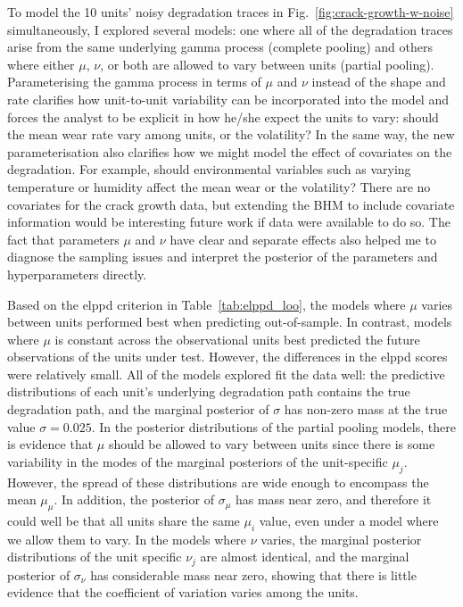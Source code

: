 To model the 10 units' noisy degradation traces in Fig.~\ref{fig:crack-growth-w-noise} simultaneously, I explored several models: one where all of the degradation traces arise from the same underlying gamma process (complete pooling) and others where either $\mu$, $\nu$, or both are allowed to vary between units (partial pooling). Parameterising the gamma process in terms of $\mu$ and $\nu$ instead of the shape and rate clarifies how unit-to-unit variability can be incorporated into the model and forces the analyst to be explicit in how he/she expect the units to vary: should the mean wear rate vary among units, or the volatility? In the same way, the new parameterisation also clarifies how we might model the effect of covariates on the degradation. For example, should environmental variables such as varying temperature or humidity affect the mean wear or the volatility? There are no covariates for the crack growth data, but extending the BHM to include covariate information would be interesting future work if data were available to do so. The fact that parameters $\mu$ and $\nu$ have clear and separate effects also helped me to diagnose the sampling issues and interpret the posterior of the parameters and hyperparameters directly.

Based on the elppd criterion in Table~\ref{tab:elppd_loo}, the models where $\mu$ varies between units performed best when predicting out-of-sample. In contrast, models where $\mu$ is constant across the observational units best predicted the future observations of the units under test. However, the differences in the elppd scores were relatively small. All of the models explored fit the data well: the predictive distributions of each unit's underlying degradation path contains the true degradation path, and the marginal posterior of $\sigma$ has non-zero mass at the true value $\sigma = 0.025$. In the posterior distributions of the partial pooling models, there is evidence that $\mu$ should be allowed to vary between units since there is some variability in the modes of the marginal posteriors of the unit-specific $\mu_j$. However, the spread of these distributions are wide enough to encompass the mean $\mu_\mu$. In addition, the posterior of $\sigma_\mu$ has mass near zero, and therefore it could well be that all units share the same $\mu_i$ value, even under a model where we allow them to vary. In the models where $\nu$ varies, the marginal posterior distributions of the unit specific $\nu_j$ are almost identical, and the marginal posterior of $\sigma_\nu$ has considerable mass near zero, showing that there is little evidence that the coefficient of variation varies among the units.

